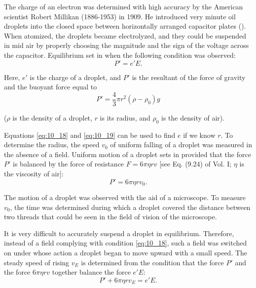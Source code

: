The charge of an electron was determined with high accuracy by the American scientist Robert Millikan (1886-1953) in 1909.
He introduced very minute oil droplets into the closed space between horizontally arranged capacitor plates ().
When atomized, the droplets became electrolyzed, and they could be suspended in mid air by properly choosing the magnitude and the sign of the voltage across the capacitor.
Equilibrium set in when the following condition was observed:
\begin{equation}\label{eq:10_18}
    P' = e' E.
\end{equation}

\noindent
Here, $e'$ is the charge of a droplet, and $P'$ is the resultant of the force of gravity and the buoyant force equal to
\begin{equation}\label{eq:10_19}
    P' = \frac{4}{3} \pi r^2 (\rho - \rho_0) g
\end{equation}

\noindent
($\rho$ is the density of a droplet, $r$ is its radius, and $\rho_0$ is the density of air).

Equations \eqref{eq:10_18} and \eqref{eq:10_19} can be used to find $e$ if we know $r$.
To determine the radius, the speed $v_0$ of uniform falling of a droplet was measured in the absence of a field.
Uniform motion of a droplet sets in provided that the force $P'$ is balanced by the force of resistance $F = 6\pi\eta rv$ [see Eq. (9.24) of Vol. I; $\eta$ is the viscosity of air]:
\begin{equation}\label{eq:10_20}
    P' = 6 \pi \eta r v_0.
\end{equation}

\noindent
The motion of a droplet was observed with the aid of a microscope.
To measure $v_0$, the time was determined during which a droplet covered the distance between two threads that could be seen in the field of vision of the microscope.

It is very difficult to accurately suspend a droplet in equilibrium.
Therefore, instead of a field complying with condition \eqref{eq:10_18}, such a field was switched on under whose action a droplet began to move upward with a small speed.
The steady speed of rising $v_E$ is determined from the condition that the force $P'$ and the force $6\pi\eta rv$ together balance the force $e'E$:
\begin{equation}\label{eq:10_21}
    P' + 6\pi\eta rv_E = e'E.
\end{equation}

